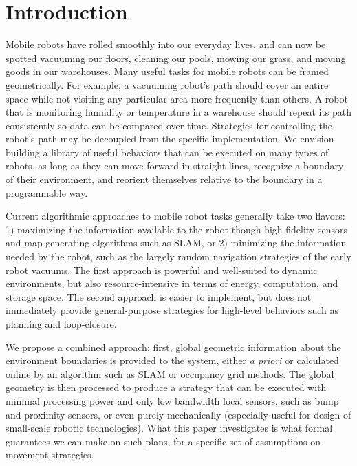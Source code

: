 \documentclass[sageh,times,Review]{sagej}
\begin{document}
\section{Introduction}

Mobile robots have rolled smoothly into our everyday lives, and can now be
spotted vacuuming our floors, cleaning our pools, mowing our grass, and moving
goods in our warehouses. Many useful tasks for mobile robots can be framed
geometrically. For example, a 
vacuuming robot's path should cover an entire space while not visiting 
any particular area more frequently than others. A robot that is monitoring
humidity or temperature in a warehouse should repeat its path consistently so data 
can be compared over time. Strategies for controlling 
the robot's path may be decoupled from the specific implementation.
We envision building a library of useful behaviors that can be executed on many
types of robots, as long as they can move forward in straight lines, recognize a
boundary of their environment, and reorient themselves relative to the boundary in a
programmable way.

Current algorithmic approaches to mobile robot tasks generally take two flavors: 
1) maximizing
the information available to the robot though high-fidelity sensors and
map-generating algorithms such as SLAM, or 2) minimizing the information needed
by the robot, such as the largely random navigation strategies of the early
robot vacuums. The first approach is powerful and well-suited to dynamic
environments, but also resource-intensive in terms of energy, computation, and
storage space. The second approach is easier to implement, but does not
immediately provide general-purpose strategies for high-level behaviors such
as planning and loop-closure.

We propose a combined approach: first, global geometric information about the 
environment boundaries
is provided to the system, either \emph{a priori} or calculated online by an
algorithm such as SLAM or occupancy grid methods. The global geometry is then 
processed to produce a
strategy that can be executed with
minimal processing power and only low bandwidth local sensors, such as bump and
proximity sensors, or even purely mechanically (especially useful for design of
small-scale robotic technologies).
What this paper investigates is what formal guarantees we can make on such
plans, for a specific set of assumptions on movement strategies.
\end{document}
